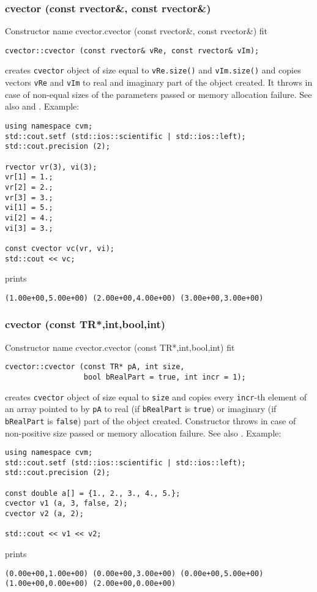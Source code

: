 \subsubsection{cvector (const rvector\&, const rvector\&)}
Constructor%
\pdfdest name {cvector.cvector (const rvector&, const rvector&)} fit
\begin{verbatim}
cvector::cvector (const rvector& vRe, const rvector& vIm);
\end{verbatim}
creates  \verb"cvector" object
of size equal to \verb"vRe.size()" and \verb"vIm.size()"
and copies vectors \verb"vRe" and \verb"vIm"
to  real and imaginary part of the object created.
It throws  
in case of non-equal sizes of the parameters passed
or memory allocation failure.
See also  and .
Example:
\begin{Verbatim}
using namespace cvm;
std::cout.setf (std::ios::scientific | std::ios::left);
std::cout.precision (2);

rvector vr(3), vi(3);
vr[1] = 1.;
vr[2] = 2.;
vr[3] = 3.;
vi[1] = 5.;
vi[2] = 4.;
vi[3] = 3.;

const cvector vc(vr, vi);
std::cout << vc;
\end{Verbatim}
prints
\begin{Verbatim}
(1.00e+00,5.00e+00) (2.00e+00,4.00e+00) (3.00e+00,3.00e+00)
\end{Verbatim}
\newpage



\subsubsection{cvector (const TR*,int,bool,int)}
Constructor%
\pdfdest name {cvector.cvector (const TR*,int,bool,int)} fit
\begin{verbatim}
cvector::cvector (const TR* pA, int size,
                  bool bRealPart = true, int incr = 1);
\end{verbatim}
creates  \verb"cvector" object
of size equal to \verb"size" and copies every
\verb"incr"-th element of an array  pointed to by \verb"pA"
to  real (if \verb"bRealPart" is \verb"true")
or imaginary (if \verb"bRealPart" is \verb"false")
part of the object created.
Constructor throws  
in case of non-positive size passed or memory allocation failure.
See also .
Example:
\begin{Verbatim}
using namespace cvm;
std::cout.setf (std::ios::scientific | std::ios::left);
std::cout.precision (2);

const double a[] = {1., 2., 3., 4., 5.};
cvector v1 (a, 3, false, 2);
cvector v2 (a, 2);

std::cout << v1 << v2;
\end{Verbatim}
prints
\begin{Verbatim}
(0.00e+00,1.00e+00) (0.00e+00,3.00e+00) (0.00e+00,5.00e+00)
(1.00e+00,0.00e+00) (2.00e+00,0.00e+00)
\end{Verbatim}
\newpage



